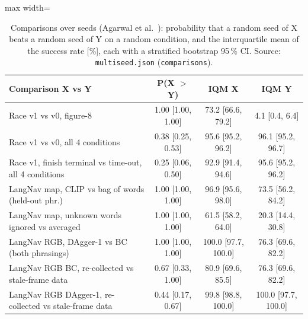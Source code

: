 \begin{table}[!htbp]\centering\small\caption{Comparisons over seeds (Agarwal et al.~\cite{agarwal2021precipice}): probability that a random seed of X beats a random seed of Y on a random condition, and the interquartile mean of the success rate [\%], each with a stratified bootstrap 95\,\% CI. Source: \texttt{multiseed.json} (\texttt{comparisons}).}\label{tab:fw_compare}
\begin{adjustbox}{max width=\linewidth}\begin{tabular}{lccc}\toprule
Comparison X vs Y & P(X $>$ Y) & IQM X & IQM Y\\\midrule
Race v1 vs v0, figure-8 & 1.00 [1.00, 1.00] & 73.2 [66.6, 79.2] & 4.1 [0.4, 6.4]\\
Race v1 vs v0, all 4 conditions & 0.38 [0.25, 0.53] & 95.6 [95.2, 96.2] & 96.1 [95.2, 96.7]\\
Race v1, finish terminal vs time-out, all 4 conditions & 0.25 [0.06, 0.50] & 92.9 [91.4, 94.6] & 95.6 [95.2, 96.2]\\
LangNav map, CLIP vs bag of words (held-out phr.) & 1.00 [1.00, 1.00] & 96.9 [95.6, 98.0] & 73.5 [56.2, 84.2]\\
LangNav map, unknown words ignored vs averaged & 1.00 [1.00, 1.00] & 61.5 [58.2, 64.0] & 20.3 [14.4, 30.8]\\
LangNav RGB, DAgger-1 vs BC (both phrasings) & 1.00 [1.00, 1.00] & 100.0 [97.7, 100.0] & 76.3 [69.6, 82.2]\\
LangNav RGB BC, re-collected vs stale-frame data & 0.67 [0.33, 1.00] & 80.9 [69.6, 85.5] & 76.3 [69.6, 82.2]\\
LangNav RGB DAgger-1, re-collected vs stale-frame data & 0.44 [0.17, 0.67] & 99.8 [98.8, 100.0] & 100.0 [97.7, 100.0]\\
\bottomrule\end{tabular}\end{adjustbox}
\end{table}

